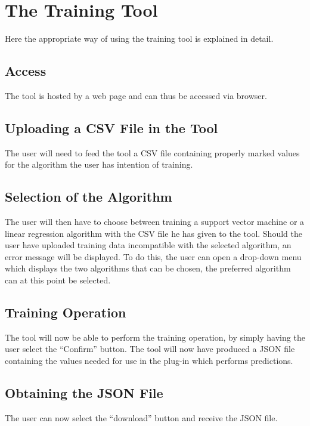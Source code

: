 \section{The Training Tool}
Here the appropriate way of using the training tool is explained in detail.

\subsection{Access}
The tool is hosted by a web page and can thus be accessed via browser.

\subsection{Uploading a CSV File in the Tool}
The user will need to feed the tool a CSV file containing properly marked values for the algorithm the user has intention of training.

\subsection{Selection of the Algorithm}
The user will then have to choose between training a support vector machine or a linear regression algorithm with the CSV file he has given to the tool.
Should the user have uploaded training data incompatible with the selected algorithm, an error message will be displayed.
To do this, the user can open a drop-down menu which displays the two algorithms that can be chosen, the preferred algorithm can at this point be selected.

\subsection{Training Operation}
The tool will now be able to perform the training operation, by simply  having the user select the “Confirm” button.
The tool will now have produced a JSON file containing the values needed for use in the plug-in which performs predictions.


\subsection{Obtaining the JSON File}
The user can now select the “download” button and receive the JSON file.
